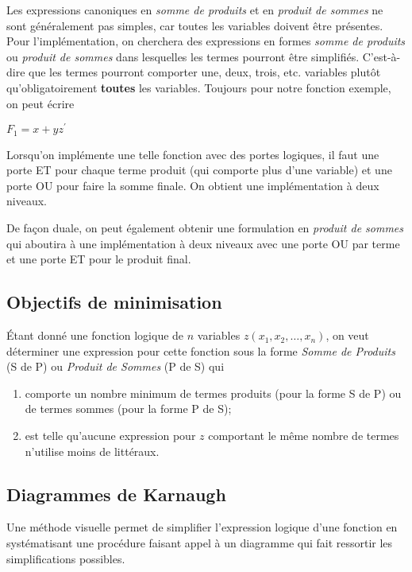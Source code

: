 \documentclass[11pt]{article}
\begin{document}
Les expressions canoniques en \emph{somme de produits} et en \emph{produit de
sommes} ne sont généralement pas simples, car toutes les variables
doivent être présentes. Pour l'implémentation, on cherchera des
expressions en formes \emph{somme de produits} ou \emph{produit de sommes} dans
lesquelles les termes pourront être simplifiés. C'est-à-dire que les
termes pourront comporter une, deux, trois, etc. variables plutôt
qu'obligatoirement \textbf{toutes} les variables. Toujours pour notre
fonction exemple, on peut écrire

\(F_1 = x + y z^\prime\)

Lorsqu'on implémente une telle fonction avec des portes logiques, il
faut une porte ET pour chaque terme produit (qui comporte plus d'une
variable) et une porte OU pour faire la somme finale. On obtient une
implémentation à deux niveaux.

De façon duale, on peut également obtenir une formulation en \emph{produit
de sommes} qui aboutira à une implémentation à deux niveaux avec une
porte OU par terme et une porte ET pour le produit final.


\subsection{Objectifs de minimisation}
\label{sec:org5bcc497}

Étant donné une fonction logique de \(n\) variables \(z(x_1, x_2, \ldots,
x_n)\), on veut déterminer une expression pour cette fonction sous la
forme \emph{Somme de Produits} (S de P) ou \emph{Produit de Sommes} (P de S) qui

\begin{enumerate}
\item comporte un nombre minimum de termes produits (pour la forme S de P)
ou de termes sommes (pour la forme P de S);

\item est telle qu'aucune expression pour \(z\) comportant le même nombre
de termes n'utilise moins de littéraux.
\end{enumerate}

\subsection{Diagrammes de Karnaugh}
\label{sec:org2cc168f}

Une méthode visuelle permet de simplifier l'expression logique d'une
fonction en systématisant une procédure faisant appel à un diagramme
qui fait ressortir les simplifications possibles.
\end{document}
